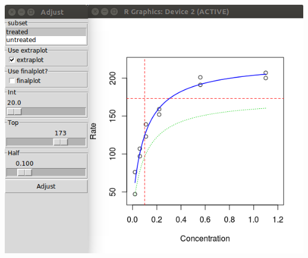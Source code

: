 \begin{frame}
\begin{columns}[t]
\begin{column}{.6\textwidth}
{{      \includegraphics[scale=0.3]{images/preview_rpanel}}}
  \end{column}
\end{columns}

\end{frame}
